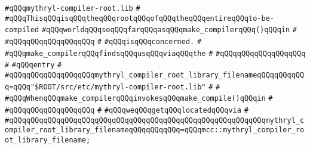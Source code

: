 \label{src/etc/mythryl-compiler-root.lib}
\verb|#qQQqmythryl-compiler-root.lib|\newline
\verb|#|\newline
\verb|#qQQqThisqQQqisqQQqtheqQQqrootqQQqofqQQqtheqQQqentireqQQqto-be-compiled|\newline
\verb|#qQQqworldqQQqsoqQQqfarqQQqasqQQqmake_compilerqQQq()qQQqin|\newline
\verb|#|\newline
\verb|#qQQqqQQqqQQqqQQqqQQq|\newline
\verb|#|\newline
\verb|#qQQqisqQQqconcerned.|\newline
\verb|#|\newline
\verb|#qQQqmake_compilerqQQqfindsqQQqusqQQqviaqQQqthe|\newline
\verb|#|\newline
\verb|#qQQqqQQqqQQqqQQqqQQq|\newline
\verb|#|\newline
\verb|#qQQqentry|\newline
\verb|#|\newline
\verb|#qQQqqQQqqQQqqQQqqQQqmythryl_compiler_root_library_filenameqQQqqQQqqQQq=qQQq"$ROOT/src/etc/mythryl-compiler-root.lib"|\newline
\verb|#|\newline
\verb|#|\newline
\verb|#qQQqWhenqQQqmake_compilerqQQqinvokesqQQqmake_compile()qQQqin|\newline
\verb|#|\newline
\verb|#qQQqqQQqqQQqqQQqqQQq|\newline
\verb|#|\newline
\verb|#qQQqweqQQqgetqQQqlocatedqQQqvia|\newline
\verb|#|\newline
\verb|#qQQqqQQqqQQqqQQqqQQqqQQqqQQqqQQqqQQqqQQqqQQqqQQqqQQqqQQqqQQqmythryl_compiler_root_library_filenameqQQqqQQqqQQq=qQQqmcc::mythryl_compiler_root_library_filename;|\newline
